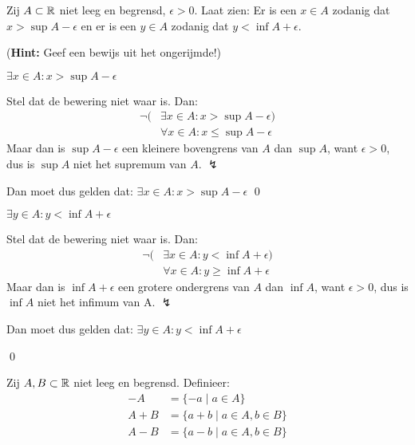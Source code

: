 \documentclass[week=1]{homework}
\begin{document}
\begin{questions}
        \question
        Zij $A \subset \mathbb{R}$ niet leeg en begrensd, $\epsilon > 0$. Laat zien: Er is een $x \in A$ zodanig dat $x > \sup A - \epsilon$ en er is een $y \in A$ zodanig dat $y < \inf A + \epsilon$.
        
        (\textbf{Hint:} Geef een bewijs uit het ongerijmde!)
        
        \toprove $\exists x \in A: x > \sup A - \epsilon$
               
        \proof 
        Stel dat de bewering niet waar is. Dan:
        \begin{align*}
        	\neg(&\exists x \in A: x > \sup A - \epsilon) \\
        	&\forall x \in A: x \le \sup A - \epsilon 
        \end{align*}
        Maar dan is $\sup A - \epsilon$ een kleinere bovengrens van $A$ dan $\sup A$, want $\epsilon > 0$, dus is $\sup A$ niet het supremum van $A$. $\lightning$
        
        Dan moet dus gelden dat: $\exists x \in A: x > \sup A - \epsilon$
        \qed
        
        \toprove $\exists y \in A: y < \inf A + \epsilon$
        
        \proof 
        Stel dat de bewering niet waar is. Dan: 
        \begin{align*}
        	\neg(&\exists x \in A: y < \inf A + \epsilon) \\
        	&\forall x \in A: y \ge \inf A + \epsilon
        \end{align*}
        Maar dan is $\inf A + \epsilon$ een grotere ondergrens van $A$ dan $\inf A$, want $\epsilon > 0$, dus is $\inf A$ niet het infimum van A. $\lightning$
        
        Dan moet dus gelden dat: $\exists y \in A: y < \inf A + \epsilon$
        
        \qed
        
        \question
        
        Zij $A,B \subset \mathbb{R}$ niet leeg en begrensd. Definieer:
        \begin{align*}
	        -A &= \{-a \mid a \in A\} \\
		    A + B &= \{a + b \mid a \in A, b \in B\} \\
			A - B &= \{a - b \mid a \in A, b \in B\}
        \end{align*}
        

\end{questions}
\end{document}
